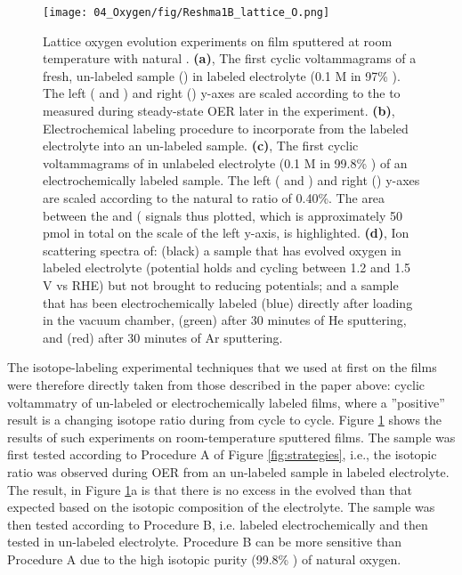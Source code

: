 \begin{figure}[h!]
	\centering
	\texttt{[image: 04\_Oxygen/fig/Reshma1B\_lattice\_O.png]}
	\caption{Lattice oxygen evolution experiments on  film sputtered at room temperature with natural . \textbf{(a)}, The first cyclic voltammagrams of a fresh, un-labeled sample () in labeled electrolyte (0.1 M  in 97\% ). The left ( and ) and right () y-axes are scaled according to the  to  measured during steady-state OER later in the experiment. \textbf{(b)}, Electrochemical labeling procedure to incorporate  from the labeled electrolyte into an un-labeled sample. \textbf{(c)}, The first cyclic voltammagrams of in unlabeled electrolyte (0.1 M  in 99.8\% ) of an electrochemically labeled sample. The left ( and ) and right () y-axes are scaled according to the natural  to  ratio of 0.40\%. The area between the  and ( signals thus plotted, which is approximately 50 pmol in total on the scale of the left y-axis, is highlighted. \textbf{(d)}, Ion scattering spectra of: (black) a sample that has evolved oxygen in labeled electrolyte (potential holds and cycling between 1.2 and 1.5 V vs RHE) but not brought to reducing potentials; and a sample that has been electrochemically labeled (blue) directly after loading in the vacuum chamber, (green) after 30 minutes of He sputtering, and (red) after 30 minutes of Ar sputtering.
	}
	\label{fig:Reshma1_lattice}
\end{figure}

The isotope-labeling experimental techniques that we used at first on the  films were therefore directly taken from those described in the paper above: cyclic voltammatry of un-labeled or electrochemically labeled films, where a  ''positive'' result is a changing isotope ratio during from cycle to cycle. Figure \ref{fig:Reshma1_lattice} shows the results of such experiments on room-temperature sputtered  films. The sample was first tested according to Procedure A of Figure \ref{fig:strategies}, i.e., the isotopic ratio was observed during OER from an un-labeled sample in labeled electrolyte. The result, in Figure \ref{fig:Reshma1_lattice}a is that there is no excess  in the evolved  than that expected based on the isotopic composition of the electrolyte. The sample was then tested according to Procedure B, i.e. labeled electrochemically and then tested in un-labeled electrolyte. Procedure B can be more sensitive than Procedure A due to the high isotopic purity (99.8\% ) of natural oxygen. 

